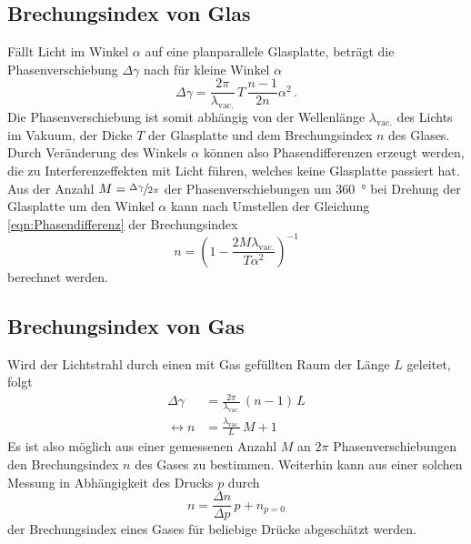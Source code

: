 \subsection{Brechungsindex von Glas}
Fällt Licht im Winkel $\alpha$ auf eine planparallele Glasplatte, beträgt die Phasenverschiebung $\Delta \gamma$ nach \cite{anleitung} für kleine Winkel $\alpha$
\begin{equation} \label{eqn:Phasendifferenz}
  \Delta \gamma = \frac{2 \pi}{\lambda_\text{vac.}} \, T \, \frac{n-1}{2n} \alpha^2 \, .
\end{equation}
Die Phasenverschiebung ist somit abhängig von der Wellenlänge $\lambda_\text{vac.}$ des Lichts im Vakuum, der Dicke $T$ der Glasplatte und dem Brechungsindex $n$ des Glases.
Durch Veränderung des Winkels $\alpha$ können also Phasendifferenzen erzeugt werden, die zu Interferenzeffekten mit Licht führen, welches keine Glasplatte passiert hat.
Aus der Anzahl $M = \sfrac{\Delta \gamma}{2 \pi}$ der Phasenverschiebungen um \SI{360}{\degree} bei Drehung der Glasplatte um den Winkel $\alpha$ kann nach Umstellen der Gleichung \eqref{eqn:Phasendifferenz} der Brechungsindex
\begin{equation}\label{eqn:n_Glas}
  n = \left( 1 - \frac{2 M \lambda_\text{vac.}}{T \alpha^2} \right)^{-1}
\end{equation}
berechnet werden.


\subsection{Brechungsindex von Gas}

Wird der Lichtstrahl durch einen mit Gas gefüllten Raum der Länge $L$ geleitet, folgt
\begin{equation} \label{eqn:n_Gas}
  \begin{split}
  \Delta \gamma &= \frac{2 \pi}{\lambda_\text{vac.}} \, (n-1) \, L \\
  \leftrightarrow n &= \frac{\lambda_\text{vac.}}{L} \,  M + 1
  \end{split}
\end{equation}
Es ist also möglich aus einer gemessenen Anzahl $M$ an $2 \pi$ Phasenverschiebungen den Brechungsindex $n$ des Gases zu bestimmen.
Weiterhin kann aus einer solchen Messung in Abhängigkeit des Drucks $p$ durch
\begin{equation*}
  n = \frac{\Delta n}{\Delta p} \, p + n_{p=0}
\end{equation*}
der Brechungsindex eines Gases für beliebige Drücke abgeschätzt werden.
